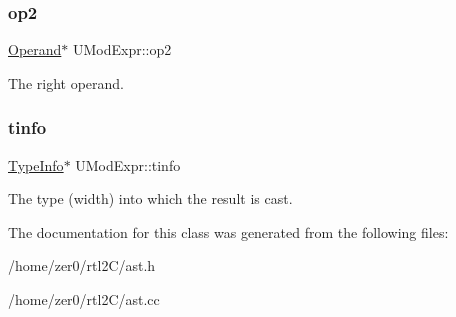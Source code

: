 \subsubsection{\texorpdfstring{op2}{op2}}
{\footnotesize\ttfamily \hyperlink{class_operand}{Operand}$\ast$ U\+Mod\+Expr\+::op2\hspace{0.3cm}{\ttfamily [protected]}}

The right operand. \mbox{\label{class_u_mod_expr_a7304199533423250b143f33edc88b6c7}} 
\subsubsection{\texorpdfstring{tinfo}{tinfo}}
{\footnotesize\ttfamily \hyperlink{class_type_info}{Type\+Info}$\ast$ U\+Mod\+Expr\+::tinfo\hspace{0.3cm}{\ttfamily [protected]}}

The type (width) into which the result is cast. 

The documentation for this class was generated from the following files\+:\begin{DoxyCompactItemize}
\item 
/home/zer0/rtl2\+C/ast.\+h\item 
/home/zer0/rtl2\+C/ast.\+cc\end{DoxyCompactItemize}
